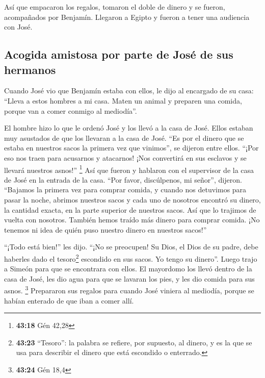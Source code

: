  Así que empacaron los regalos, tomaron el doble de
dinero y se fueron, acompañados por Benjamín. Llegaron a Egipto y fueron
a tener una audiencia con José.

\hypertarget{acogida-amistosa-por-parte-de-josuxe9-de-sus-hermanos}{%
\subsection{Acogida amistosa por parte de José de sus
hermanos}\label{acogida-amistosa-por-parte-de-josuxe9-de-sus-hermanos}}

 Cuando José vio que Benjamín estaba con ellos, le dijo
al encargado de su casa: ``Lleva a estos hombres a mi casa. Maten un
animal y preparen una comida, porque van a comer conmigo al mediodía''.

 El hombre hizo lo que le ordenó José y los llevó a la
casa de José.  Ellos estaban muy asustados de que los
llevaran a la casa de José. ``Es por el dinero que se estaba en nuestros
sacos la primera vez que vinimos'', se dijeron entre ellos. ``¡Por eso
nos traen para acusarnos y atacarnos! ¡Nos convertirá en sus esclavos y
se llevará nuestros asnos!'' \footnote{\textbf{43:18} Gén 42,28}
 Así que fueron y hablaron con el supervisor de la casa
de José en la entrada de la casa.  ``Por favor,
discúlpenos, mi señor'', dijeron. ``Bajamos la primera vez para comprar
comida,  y cuando nos detuvimos para pasar la noche,
abrimos nuestros sacos y cada uno de nosotros encontró su dinero, la
cantidad exacta, en la parte superior de nuestros sacos. Así que lo
trajimos de vuelta con nosotros.  También hemos traído
más dinero para comprar comida. ¡No tenemos ni idea de quién puso
nuestro dinero en nuestros sacos!''

 ``¡Todo está bien!'' les dijo. ``¡No se preocupen! Su
Dios, el Dios de su padre, debe haberles dado el tesoro\footnote{\textbf{43:23}
  ``Tesoro'': la palabra se refiere, por supuesto, al dinero, y es la
  que se usa para describir el dinero que está escondido o enterrado.}
escondido en sus sacos. Yo tengo su dinero''. Luego trajo a Simeón para
que se encontrara con ellos.  El mayordomo los llevó
dentro de la casa de José, les dio agua para que se lavaran los pies, y
les dio comida para sus asnos. \footnote{\textbf{43:24} Gén 18,4}
 Prepararon sus regalos para cuando José viniera al
mediodía, porque se habían enterado de que iban a comer allí.

